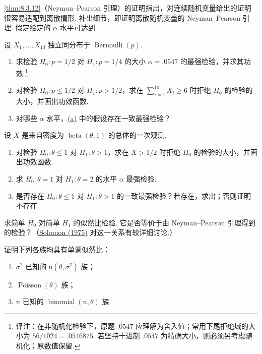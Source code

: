 \begin{exercise}\label{exercise:8.21}
\autoref{thm:8.3.12}（Neyman–Pearson 引理）的证明指出，对连续随机变量给出的证明很容易适配到离散情形. 补出细节，即证明离散随机变量的 Neyman–Pearson 引理. 假定给定的 $\alpha$ 水平可达到.
\end{exercise}
\begin{exercise}\label{exercise:8.22}
设 $X_1,\ldots,X_{10}$ 独立同分布于 $\operatorname{Bernoulli}(p)$.
\begin{enumerate}
\item{}\label{itm:exercise:8.22:a} 求检验 $H_0:p=1/2$ 对 $H_1:p=1/4$ 的大小 $\alpha=.0547$ 的最强检验，并求其功效.\footnote{译注：在非随机化检验下，原题 $.0547$ 应理解为舍入值；常用下尾拒绝域的大小为 $56/1024=.0546875$. 若坚持十进制 $.0547$ 为精确大小，则必须另考虑随机化；原数值保留.}
\item 对检验 $H_0:p\le1/2$ 对 $H_1:p>1/2$，求在 $\sum_{i=1}^{10}X_i\ge6$ 时拒绝 $H_0$ 的检验的大小，并画出功效函数.
\item 对哪些 $\alpha$ 水平，\hyperref[itm:exercise:8.22:a]{(a)} 中的假设存在一致最强检验？
\end{enumerate}
\end{exercise}
\begin{exercise}\label{exercise:8.23}
设 $X$ 是来自密度为 $\operatorname{beta}(\theta,1)$ 的总体的一次观测.
\begin{enumerate}
\item 对检验 $H_0:\theta\le1$ 对 $H_1:\theta>1$，求在 $X>1/2$ 时拒绝 $H_0$ 的检验的大小，并画出功效函数.
\item 求 $H_0:\theta=1$ 对 $H_1:\theta=2$ 的水平 $\alpha$ 最强检验.
\item 是否存在 $H_0:\theta\le1$ 对 $H_1:\theta>1$ 的一致最强检验？若存在，求出；否则证明不存在.
\end{enumerate}
\end{exercise}
\begin{exercise}\label{exercise:8.24}
求简单 $H_0$ 对简单 $H_1$ 的似然比检验. 它是否等价于由 Neyman–Pearson 引理得到的检验？（\hyperref[bib:source296]{Solomon (1975)} 对这一关系有较详细讨论.）
\end{exercise}
\begin{exercise}\label{exercise:8.25}
证明下列各族均具有单调似然比：
\begin{enumerate}
\item $\sigma^2$ 已知的 $\mathrm n(\theta,\sigma^2)$ 族；
\item $\operatorname{Poisson}(\theta)$ 族；
\item $n$ 已知的 $\operatorname{binomial}(n,\theta)$ 族.
\end{enumerate}
\end{exercise}
